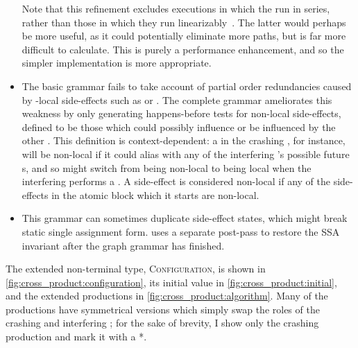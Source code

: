 \begin{itemize}
  Note that this refinement excludes executions in which the
  {\StateMachines} run in series, rather than those in which they run
  linearizably~\cite{Herlihy1990}.  The latter would perhaps be more
  useful, as it could potentially eliminate more paths, but is far
  more difficult to calculate.  This is purely a performance
  enhancement, and so the simpler implementation is more appropriate.
\item The basic grammar fails to take account of partial order
  redundancies caused by {\StateMachine}-local side-effects such as
   or .  The complete grammar ameliorates
  this weakness by only generating happens-before tests for non-local
  side-effects, defined to be those which could possibly influence or
  be influenced by the other {\StateMachine}.  This definition is
  context-dependent: a  in the crashing {\StateMachine},
  for instance, will be non-local if it could alias with any of the
  interfering {\StateMachine}'s possible future s, and so
  might switch from being non-local to being local when the
  interfering {\StateMachine} performs a .  A
  {\stStartAtomic} side-effect is considered non-local if any of the
  side-effects in the atomic block which it starts are non-local.
\item This grammar can sometimes duplicate side-effect states, which
  might break static single assignment form.  {\Technique} uses a
  separate post-pass to restore the SSA invariant after the graph
  grammar has finished.
\end{itemize}
The extended non-terminal type, \textsc{Configuration}, is shown in
\autoref{fig:cross_product:configuration}, its initial value in
\autoref{fig:cross_product:initial}, and the extended productions in
\autoref{fig:cross_product:algorithm}.  Many of the productions have
symmetrical versions which simply swap the roles of the crashing and
interfering {\StateMachines}; for the sake of brevity, I show only the
crashing {\StateMachine} production and mark it with a *.

